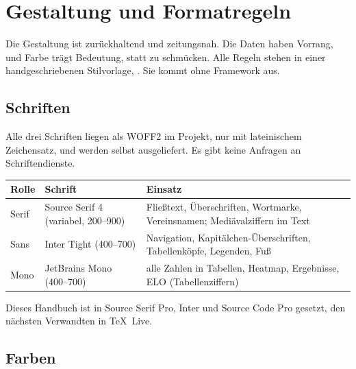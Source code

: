 \chapter{Gestaltung und Formatregeln}\label{kap:design}

Die Gestaltung ist zurückhaltend und zeitungsnah. Die Daten haben Vorrang,
und Farbe trägt Bedeutung, statt zu schmücken. Alle Regeln stehen in einer
handgeschriebenen Stilvorlage, . Sie
kommt ohne Framework aus.

\section{Schriften}

Alle drei Schriften liegen als WOFF2 im Projekt, nur mit lateinischem
Zeichensatz, und werden selbst ausgeliefert. Es gibt keine Anfragen an
Schriftendienste.

\begin{center}
\small
\begin{tabularx}{\textwidth}{@{}llX@{}}
\toprule
Rolle & Schrift & Einsatz \\
\midrule
Serif & Source Serif 4 (variabel, 200--900) & Fließtext, Überschriften, Wortmarke, Vereinsnamen; Mediävalziffern im Text \\
Sans  & Inter Tight (400--700) & Navigation, Kapitälchen-Überschriften, Tabellenköpfe, Legenden, Fuß \\
Mono  & JetBrains Mono (400--700) & alle Zahlen in Tabellen, Heatmap, Ergebnisse, ELO (Tabellenziffern) \\
\bottomrule
\end{tabularx}
\end{center}

Dieses Handbuch ist in Source Serif Pro, Inter und Source Code Pro gesetzt,
den nächsten Verwandten in \TeX\ Live.

\section{Farben}

